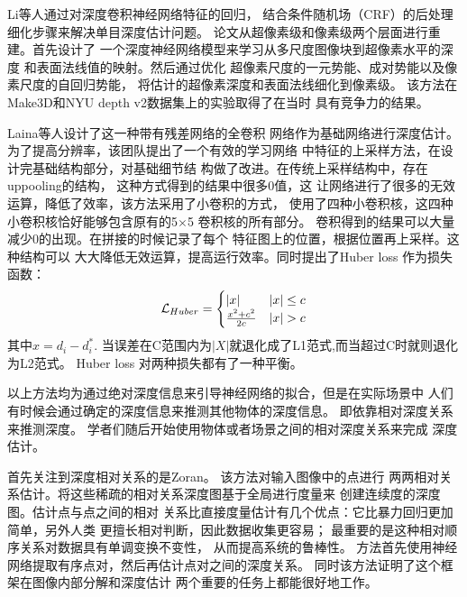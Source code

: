 Li等人\cite{li2015depth}通过对深度卷积神经网络特征的回归，
结合条件随机场（CRF）的后处理细化步骤来解决单目深度估计问题。
论文从超像素级和像素级两个层面进行重建。首先设计了
一个深度神经网络模型来学习从多尺度图像块到超像素水平的深度
和表面法线值的映射。然后通过优化
超像素尺度的一元势能、成对势能以及像素尺度的自回归势能，
将估计的超像素深度和表面法线细化到像素级。
该方法在Make3D和NYU depth v2数据集上的实验取得了在当时
具有竞争力的结果。

Laina等人\cite{laina2016deeper}设计了这一种带有残差网络的全卷积
网络作为基础网络进行深度估计。为了提高分辨率，该团队提出了一个有效的学习网络
中特征的上采样方法，在设计完基础结构部分，对基础细节结
构做了改进。在传统上采样结构中，存在uppooling的结构，
这种方式得到的结果中很多0值，这
让网络进行了很多的无效运算，降低了效率，该方法采用了小卷积的方式，
使用了四种小卷积核，这四种小卷积核恰好能够包含原有的5$\times$5
卷积核的所有部分。
卷积得到的结果可以大量减少0的出现。在拼接的时候记录了每个
特征图上的位置，根据位置再上采样。这种结构可以
大大降低无效运算，提高运行效率。同时提出了Huber loss 作为损失函数：
\begin{align}
    \mathcal{L}_{Huber} = 
    \begin{cases}
        |x| & \text{$ |x| \leq c$} \\
        \frac{x^2+c^2}{2c} & \text{$|x| > c$}
    \end{cases}
\end{align}其中$x = d_i - d_i^*$.
当误差在C范围内为$|X|$就退化成了L1范式,而当超过C时就则退化为L2范式。
Huber loss 对两种损失都有了一种平衡。

以上方法均为通过绝对深度信息来引导神经网络的拟合，但是在实际场景中
人们有时候会通过确定的深度信息来推测其他物体的深度信息。
即依靠相对深度关系来推测深度。
学者们随后开始使用物体或者场景之间的相对深度关系来完成
深度估计。

首先关注到深度相对关系的是Zoran\cite{zoran2015learning}。
该方法对输入图像中的点进行
两两相对关系估计。将这些稀疏的相对关系深度图基于全局进行度量来
创建连续度的深度图。估计点与点之间的相对
关系比直接度量估计有几个优点：它比暴力回归更加简单，另外人类
更擅长相对判断，因此数据收集更容易；
最重要的是这种相对顺序关系对数据具有单调变换不变性，
从而提高系统的鲁棒性。
方法首先使用神经网络提取有序点对，然后再估计点对之间的深度关系。
同时该方法证明了这个框架在图像内部分解和深度估计
两个重要的任务上都能很好地工作。

